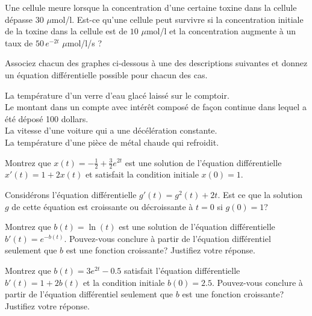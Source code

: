 \begin{question}[\life]
Une cellule meure lorsque la concentration d'une certaine toxine dans
la cellule dépasse $30$ $\mu$mol/l.  Est-ce qu'une cellule peut
survivre si la concentration initiale de la toxine dans la cellule est
de $10$ $\mu$mol/l et la concentration augmente à un taux de
$50 \, e^{-2t}$ $\mu$mol/l/s ?
\label{10Q15}
\end{question}

\begin{question}
Associez chacun des graphes ci-dessous à une des descriptions
suivantes et donnez un équation différentielle possible pour chacun
des cas.

 La température d'un verre d'eau glacé laissé sur
le comptoir.\\
 Le montant dans un compte avec intérêt composé de façon
continue dans lequel a été déposé 100 dollars.\\
 La vitesse d'une voiture qui a une décélération constante.\\
 La température d'une pièce de métal chaude qui refroidit.
\label{10Q16}
\end{question}

\begin{question}
Montrez que $\displaystyle x(t) = - \frac{1}{2} + \frac{3}{2} e^{2t}$ est une
solution de l'équation différentielle $x'(t) = 1 + 2x(t)$
et satisfait la condition initiale $x(0)=1$.
\label{10Q17}
\end{question}

\begin{question}
Considérons l'équation différentielle $g'(t) = g^2(t)+2t$. 
Est ce que la solution $g$ de cette équation est croissante ou décroissante à
$t=0$ si $g(0)=1$?
\label{10Q18}
\end{question}

\begin{question}
Montrez que $b(t) = \ln(t)$ est une solution de l'équation
différentielle $b'(t) = e^{-b(t)}$.    Pouvez-vous conclure à partir
de l'équation différentiel seulement que $b$ est une fonction
croissante?  Justifiez votre réponse.
\label{10Q19}
\end{question}

\begin{question}
Montrez que $b(t) = 3 e^{2t} - 0.5$ satisfait l'équation différentielle
$b'(t) = 1 + 2b(t)$ et la condition initiale
$b(0)= 2.5$.  Pouvez-vous conclure à partir de l'équation différentiel
seulement que $b$ est une fonction croissante?  Justifiez votre réponse.
\label{10Q20}
\end{question}

